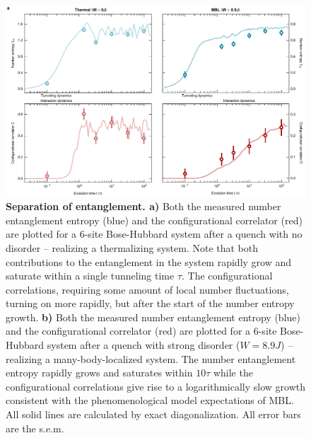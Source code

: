 \begin{figure}[t!]
		\includegraphics[width=\columnwidth]{figures/ch5/figure4_raw.pdf} 
		\caption{\textbf{Separation of entanglement. a)} Both the measured number entanglement entropy (blue) and the configurational correlator (red) are plotted for a $6$-site Bose-Hubbard system after a quench with no disorder -- realizing a thermalizing system. Note that both contributions to the entanglement in the system rapidly grow and saturate within a single tunneling time $\tau$. The configurational correlations, requiring some amount of local number fluctuations, turning on more rapidly, but after the start of the number entropy growth. \textbf{b)} Both the measured number entanglement entropy (blue) and the configurational correlator (red) are plotted for a $6$-site Bose-Hubbard system after a quench with strong disorder ($W=8.9J$) -- realizing a many-body-localized system. The number entanglement entropy rapidly grows and saturates within $10\tau$ while the configurational correlations give rise to a logarithmically slow growth consistent with the phenomenological model expectations of MBL. All solid lines are calculated by exact diagonalization. All error bars are the s.e.m.}
		\label{fig:ch5fig4}	
\end{figure}


